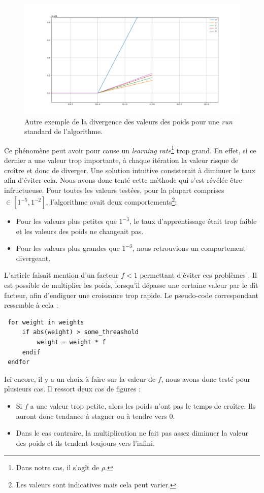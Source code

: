 \documentclass[a4paper, 11pt]{article}
\begin{document}
\begin{figure}[H]
\centering
\includegraphics[scale=0.4]{images/run_2}
\caption{Autre exemple de la divergence des valeurs des poids pour une \textit{run} standard de l'algorithme.}
\end{figure}

Ce phénomène peut avoir pour cause un \textit{learning rate}\footnote{Dans notre cas, il s'agît de $\rho$.} trop grand. En effet, si ce dernier a une
valeur trop importante, à chaque itération la valeur risque de croître et donc de diverger. Une solution intuitive consisterait à diminuer le taux afin
d'éviter cela. Nous avons donc tenté cette méthode qui s'est révélée être infructueuse. Pour toutes les valeurs testées, pour la plupart comprises
$\in [1^{-5},1^{-2}]$, l'algorithme avait deux comportements\footnote{Les valeurs sont indicatives mais cela peut varier.}:
\begin{itemize}
 \item Pour les valeurs plus petites que $1^{-3}$, le taux d'apprentissage était trop faible et les valeurs des poids ne changeait pas.
 \item Pour les valeurs plus grandes que $1^{-3}$, nous retrouvions un comportement divergeant.
\end{itemize}

L'article faisait mention d'un facteur $f < 1$ permettant d'éviter ces problèmes \cite{fx_trading}. Il est possible de multiplier les poids, lorsqu'il 
dépasse une certaine valeur par le dît facteur, afin d'endiguer une croissance trop rapide. Le pseudo-code correspondant ressemble à cela :
\begin{lstlisting}
 for weight in weights
     if abs(weight) > some_threashold
         weight = weight * f
     endif
 endfor
\end{lstlisting}

Ici encore, il y a un choix à faire sur la valeur de $f$, nous avons donc testé pour plusieurs cas. Il ressort deux cas de figures :
\begin{itemize}
 \item Si $f$ a une valeur trop petite, alors les poids n'ont pas le temps de croître. Ils auront donc tendance à stagner ou à tendre vers $0$.
 \item Dans le cas contraire, la multiplication ne fait pas assez diminuer la valeur des poids et ils tendent toujours vers l'infini.
\end{itemize}
\end{document}
